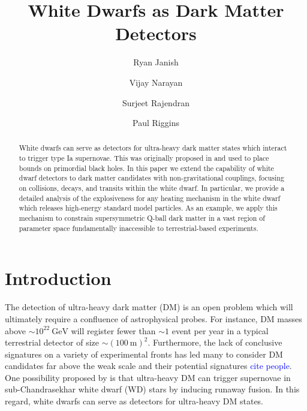 \documentclass[twocolumn,showpacs,preprintnumbers,amsmath,amssymb,prd]{revtex4}
\newcommand{\GeV}{\text{GeV}}
\begin{document}
\title{White Dwarfs as Dark Matter Detectors}

\author{Ryan Janish}

\author{Vijay Narayan}

\author{Surjeet Rajendran}

\author{Paul Riggins}

\begin{abstract}

White dwarfs can serve as detectors for ultra-heavy dark matter states which interact to trigger type Ia supernovae. This was originally proposed in \cite{Graham:2015apa} and used to  place bounds on primordial black holes. In this paper we extend the capability of white dwarf detectors to dark matter candidates with non-gravitational couplings, focusing on collisions, decays, and transits within the white dwarf. In particular, we provide a detailed analysis of the explosiveness for any heating mechanism in the white dwarf which releases high-energy standard model particles. As an example, we apply this mechanism to constrain supersymmetric Q-ball dark matter in a vast region of parameter space fundamentally inaccessible to terrestrial-based experiments. 

\end{abstract}
\maketitle


\section{Introduction}
\label{sec:Introduction}

The detection of ultra-heavy dark matter (DM) is an open problem which will ultimately require a confluence of astrophysical probes. For instance, DM masses above $\sim 10^{22} ~\GeV$ will register fewer than $\sim 1$ event per year in a typical terrestrial detector of size $\sim (100 ~\text{m})^2$. Furthermore, the lack of conclusive signatures on a variety of experimental fronts has led many to consider DM candidates far above the weak scale and their potential signatures \textcolor{blue}{cite people}. One possibility proposed by \cite{Graham:2015apa} is that ultra-heavy DM can trigger supernovae in sub-Chandrasekhar white dwarf (WD) stars by inducing runaway fusion.  In this regard, white dwarfs can serve as detectors for ultra-heavy DM states.
\end{document}
